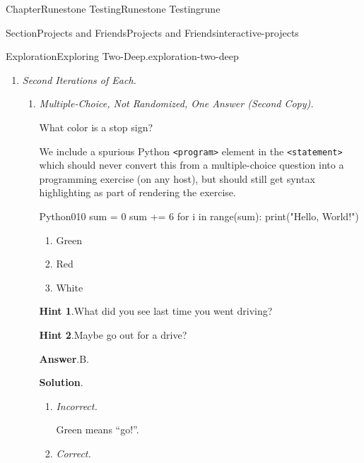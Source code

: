 \documentclass[oneside,10pt,]{book}
\newcommand{\blocktitlefont}{\relax}
\newcommand{\mono}[1]{\texttt{#1}}
\newcommand{\lititle}[1]{{\slshape#1}}
\numberwithin{equation}{section}
\begin{document}
\begin{chapterptx}{Chapter}{Runestone Testing}{}{Runestone Testing}{}{}{rune}
\begin{sectionptx}{Section}{Projects and Friends}{}{Projects and Friends}{}{}{interactive-projects}
\begin{exploration}{Exploration}{Exploring Two-Deep.}{exploration-two-deep}
\begin{enumerate}[font=\bfseries,label=(\alph*),ref=\alph*]
\begin{enumerate}[font=\bfseries,label=(\roman*),ref=\theenumi.\roman*]
\begin{program}{Python}{0}{1}{0}
for i in range(10):
    print(i)
\end{program}
\par\smallskip%
\noindent\textbf{\blocktitlefont Answer}.\hypertarget{task-active-code-first-3}{}\quad{}We're still not really sure.%
\end{enumerate}%
\item{}\lititle{Second Iterations of Each.}\par%
\begin{enumerate}[font=\bfseries,label=(\roman*),ref=\theenumi.\roman*]%
\item{}\lititle{Multiple-Choice, Not Randomized, One Answer (Second Copy).}\par%
What color is a stop sign?%
\par
We include a spurious Python \mono{<program>} element in the \mono{<statement>} which should never convert this from a multiple-choice question into a programming exercise (on any host), but should still get syntax highlighting as part of rendering the exercise.%
\begin{program}{Python}{0}{1}{0}
sum = 0
sum += 6
for i in range(sum):
    print("Hello, World!")
\end{program}
%
\begin{enumerate}[label={\Alph*.}]
\item{}Green%
\item{}Red%
\item{}White%
\end{enumerate}
%
\par\smallskip%
\noindent\textbf{\blocktitlefont Hint 1}.\hypertarget{task-multiple-choice-second-4}{}\quad{}What did you see last time you went driving?%
\par\smallskip%
\noindent\textbf{\blocktitlefont Hint 2}.\hypertarget{task-multiple-choice-second-5}{}\quad{}Maybe go out for a drive?%
\par\smallskip%
\noindent\textbf{\blocktitlefont Answer}.\hypertarget{task-multiple-choice-second-6}{}\quad{}B.%
\par\smallskip%
\noindent\textbf{\blocktitlefont Solution}.\hypertarget{task-multiple-choice-second-7}{}\quad{}%
\begin{enumerate}[label={\Alph*.}]
\item{}\lititle{Incorrect.}\par%
Green means ``go!''.%
\item{}\lititle{Correct.}\par%

\end{enumerate}
\end{enumerate}
\end{enumerate}
\end{exploration}
\end{sectionptx}
\end{chapterptx}
\end{document}
